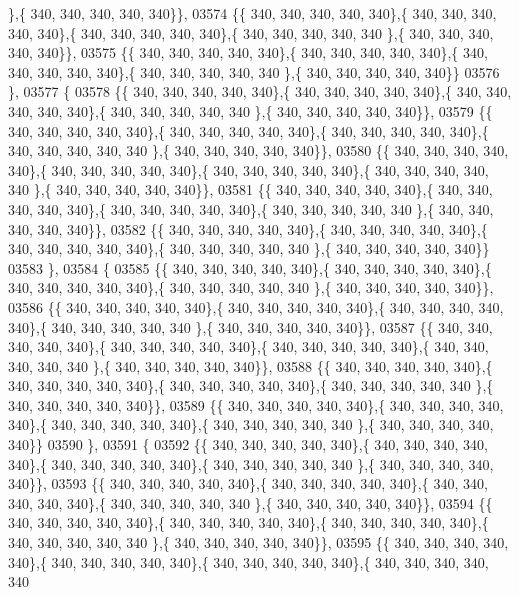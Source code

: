 \begin{DoxyCode}
      \},\{ 340, 340, 340, 340, 340\}\},
03574 \{\{ 340, 340, 340, 340, 340\},\{ 340, 340, 340, 340, 340\},\{ 340, 340, 340, 340, 340\},\{ 340, 340, 340, 340, 340
      \},\{ 340, 340, 340, 340, 340\}\},
03575 \{\{ 340, 340, 340, 340, 340\},\{ 340, 340, 340, 340, 340\},\{ 340, 340, 340, 340, 340\},\{ 340, 340, 340, 340, 340
      \},\{ 340, 340, 340, 340, 340\}\}
03576 \},
03577 \{
03578 \{\{ 340, 340, 340, 340, 340\},\{ 340, 340, 340, 340, 340\},\{ 340, 340, 340, 340, 340\},\{ 340, 340, 340, 340, 340
      \},\{ 340, 340, 340, 340, 340\}\},
03579 \{\{ 340, 340, 340, 340, 340\},\{ 340, 340, 340, 340, 340\},\{ 340, 340, 340, 340, 340\},\{ 340, 340, 340, 340, 340
      \},\{ 340, 340, 340, 340, 340\}\},
03580 \{\{ 340, 340, 340, 340, 340\},\{ 340, 340, 340, 340, 340\},\{ 340, 340, 340, 340, 340\},\{ 340, 340, 340, 340, 340
      \},\{ 340, 340, 340, 340, 340\}\},
03581 \{\{ 340, 340, 340, 340, 340\},\{ 340, 340, 340, 340, 340\},\{ 340, 340, 340, 340, 340\},\{ 340, 340, 340, 340, 340
      \},\{ 340, 340, 340, 340, 340\}\},
03582 \{\{ 340, 340, 340, 340, 340\},\{ 340, 340, 340, 340, 340\},\{ 340, 340, 340, 340, 340\},\{ 340, 340, 340, 340, 340
      \},\{ 340, 340, 340, 340, 340\}\}
03583 \},
03584 \{
03585 \{\{ 340, 340, 340, 340, 340\},\{ 340, 340, 340, 340, 340\},\{ 340, 340, 340, 340, 340\},\{ 340, 340, 340, 340, 340
      \},\{ 340, 340, 340, 340, 340\}\},
03586 \{\{ 340, 340, 340, 340, 340\},\{ 340, 340, 340, 340, 340\},\{ 340, 340, 340, 340, 340\},\{ 340, 340, 340, 340, 340
      \},\{ 340, 340, 340, 340, 340\}\},
03587 \{\{ 340, 340, 340, 340, 340\},\{ 340, 340, 340, 340, 340\},\{ 340, 340, 340, 340, 340\},\{ 340, 340, 340, 340, 340
      \},\{ 340, 340, 340, 340, 340\}\},
03588 \{\{ 340, 340, 340, 340, 340\},\{ 340, 340, 340, 340, 340\},\{ 340, 340, 340, 340, 340\},\{ 340, 340, 340, 340, 340
      \},\{ 340, 340, 340, 340, 340\}\},
03589 \{\{ 340, 340, 340, 340, 340\},\{ 340, 340, 340, 340, 340\},\{ 340, 340, 340, 340, 340\},\{ 340, 340, 340, 340, 340
      \},\{ 340, 340, 340, 340, 340\}\}
03590 \},
03591 \{
03592 \{\{ 340, 340, 340, 340, 340\},\{ 340, 340, 340, 340, 340\},\{ 340, 340, 340, 340, 340\},\{ 340, 340, 340, 340, 340
      \},\{ 340, 340, 340, 340, 340\}\},
03593 \{\{ 340, 340, 340, 340, 340\},\{ 340, 340, 340, 340, 340\},\{ 340, 340, 340, 340, 340\},\{ 340, 340, 340, 340, 340
      \},\{ 340, 340, 340, 340, 340\}\},
03594 \{\{ 340, 340, 340, 340, 340\},\{ 340, 340, 340, 340, 340\},\{ 340, 340, 340, 340, 340\},\{ 340, 340, 340, 340, 340
      \},\{ 340, 340, 340, 340, 340\}\},
03595 \{\{ 340, 340, 340, 340, 340\},\{ 340, 340, 340, 340, 340\},\{ 340, 340, 340, 340, 340\},\{ 340, 340, 340, 340, 340

\end{DoxyCode}
